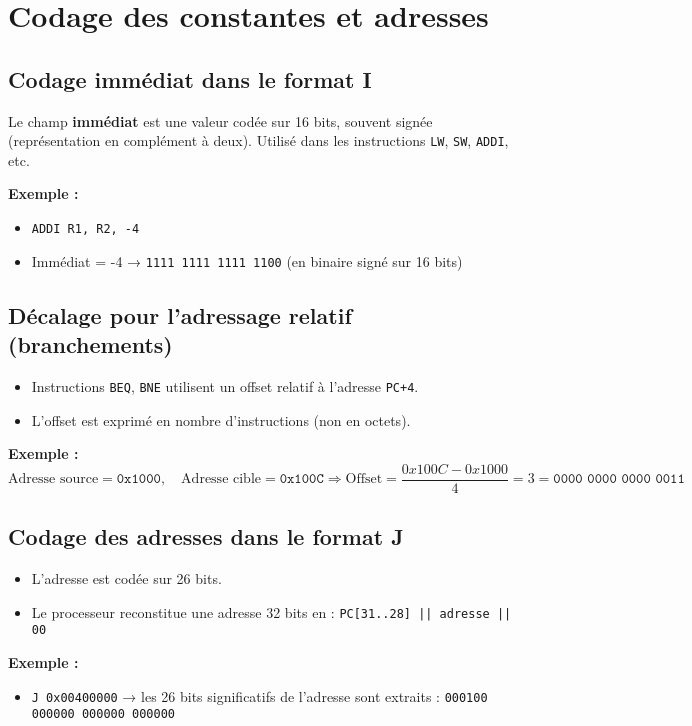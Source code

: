 \documentclass[12pt,a4paper]{article}
\begin{document}
\section{Codage des constantes et adresses}
\subsection{Codage immédiat dans le format I}
Le champ \textbf{immédiat} est une valeur codée sur 16 bits, souvent signée (représentation en complément à deux). Utilisé dans les instructions \texttt{LW}, \texttt{SW}, \texttt{ADDI}, etc.

\textbf{Exemple :}
\begin{itemize}
  \item \texttt{ADDI R1, R2, -4}
  \item Immédiat = -4 → \texttt{1111 1111 1111 1100} (en binaire signé sur 16 bits)
\end{itemize}

\subsection{Décalage pour l'adressage relatif (branchements)}
\begin{itemize}
  \item Instructions \texttt{BEQ}, \texttt{BNE} utilisent un offset relatif à l’adresse \texttt{PC+4}.
  \item L’offset est exprimé en nombre d’instructions (non en octets).
\end{itemize}

\textbf{Exemple :}
\[
\text{Adresse source} = \texttt{0x1000}, \quad
\text{Adresse cible} = \texttt{0x100C}
\Rightarrow \text{Offset} = \frac{0x100C - 0x1000}{4} = 3 = \texttt{0000 0000 0000 0011}
\]


\subsection{Codage des adresses dans le format J}
\begin{itemize}
  \item L’adresse est codée sur 26 bits.
  \item Le processeur reconstitue une adresse 32 bits en : \texttt{PC[31..28] || adresse || 00}
\end{itemize}

\textbf{Exemple :}
\begin{itemize}
  \item \texttt{J 0x00400000} → les 26 bits significatifs de l’adresse sont extraits : \texttt{000100 000000 000000 000000}
\end{itemize}
\end{document}
